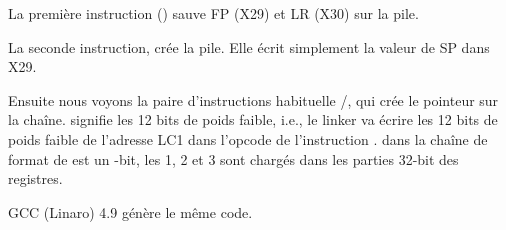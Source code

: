 



La première instruction  () sauve \ac{FP} (X29) et \ac{LR} (X30) sur la pile.

La seconde instruction,  crée la pile.
Elle écrit simplement la valeur de \ac{SP} dans X29.

Ensuite nous voyons la paire d'instructions habituelle /\ADD, qui crée
le pointeur sur la chaîne.
 signifie les 12 bits de poids faible, i.e., le linker va écrire les 12 bits
de poids faible de l'adresse LC1 dans l'opcode de l'instruction \ADD.
 dans la chaîne de format de \printf est un -bit, les 1, 2 et
3 sont chargés dans les parties 32-bit des registres.

GCC (Linaro) 4.9 \Optimizing génère le même code.

